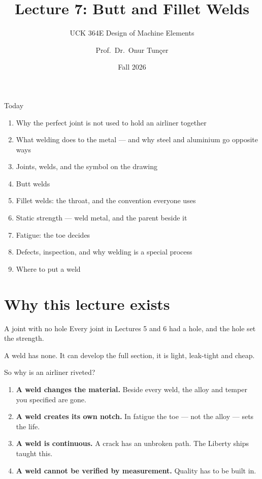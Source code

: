 \documentclass[aspectratio=169,10pt]{beamer}
\title{Lecture 7: Butt and Fillet Welds}
\subtitle{UCK 364E Design of Machine Elements}
\author{Prof.\ Dr.\ Onur Tunçer}
\institute{Department of Aeronautical Engineering, Istanbul Technical University}
\date{Fall 2026}
\begin{document}
\maketitle

\begin{frame}{Today}
\begin{enumerate}
  \item Why the perfect joint is not used to hold an airliner together
  \item What welding does to the metal --- and why steel and aluminium go opposite ways
  \item Joints, welds, and the symbol on the drawing
  \item Butt welds
  \item Fillet welds: the throat, and the convention everyone uses
  \item Static strength --- weld metal, and the parent beside it
  \item Fatigue: the toe decides
  \item Defects, inspection, and why welding is a special process
  \item Where to put a weld
\end{enumerate}
\end{frame}

\section{Why this lecture exists}

\begin{frame}{A joint with no hole}
Every joint in Lectures 5 and 6 had a hole, and the hole set the strength.

\medskip
A weld has none. It can develop the \alert{full section}, it is light, leak-tight and cheap.

\vfill
So why is an airliner riveted?
\begin{enumerate}
  \item \textbf{A weld changes the material.} Beside every weld, the alloy and temper you specified are gone.
  \item \textbf{A weld creates its own notch.} In fatigue the toe --- not the alloy --- sets the life.
  \item \textbf{A weld is continuous.} A crack has an unbroken path. The Liberty ships taught this.
  \item \textbf{A weld cannot be verified by measurement.} Quality has to be built in.
\end{enumerate}
\end{frame}
\end{document}
